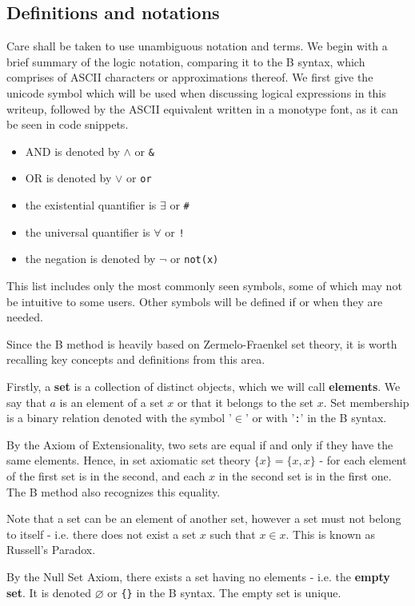\documentclass[11pt,journal]{IEEEtran}
\begin{document}
	\subsection{Definitions and notations}
	Care shall be taken to use unambiguous notation and terms. We begin with a brief summary of the logic notation, comparing it to the B syntax, which comprises of ASCII characters or approximations thereof. We first give the unicode symbol which will be used when discussing logical expressions in this writeup, followed by the ASCII equivalent written in a monotype font, as it can be seen in code snippets. 
	\begin{itemize}
		\item AND is denoted by $\wedge$ or \texttt{\&}
		\item OR is denoted by $\vee$ or \texttt{or}
		\item the existential quantifier is $\exists$ or \texttt{\#}
		\item the universal quantifier is $\forall$ or \texttt{!}
		\item the negation is denoted by $\neg$ or \texttt{not(x)}
	\end{itemize}
	This list includes only the most commonly seen symbols, some of which may not be intuitive to some users. Other symbols will be defined if or when they are needed.
	
	Since the B method is heavily based on Zermelo-Fraenkel set theory, it is worth recalling key concepts and definitions from this area.\cite{Goldrei}
	
	Firstly, a \textbf{set} is a collection of distinct objects, which we will call \textbf{elements}. We say that $a$ is an element of a set $x$ or that it belongs to the set $x$. Set membership is a binary relation denoted with the symbol '$\in$' or with '\texttt{:}' in the B syntax.
	
	By the Axiom of Extensionality, two sets are equal if and only if they have the same elements. Hence, in set axiomatic set theory $\{x\} = \{x, x\}$ - for each element of the first set is in the second, and each $x$ in the second set is in the first one. The B method also recognizes this equality\cite{b-method}. 
	
	Note that a set can be an element of another set, however a set must not belong to itself - i.e. there does not exist a set $x$ such that $x \in x$. This is known as Russell's Paradox.
	
	By the Null Set Axiom, there exists a set having no elements - i.e. the \textbf{empty set}. It is denoted $\varnothing$ or \texttt{\{\}} in the B syntax. The empty set is unique.
	
\end{document}
